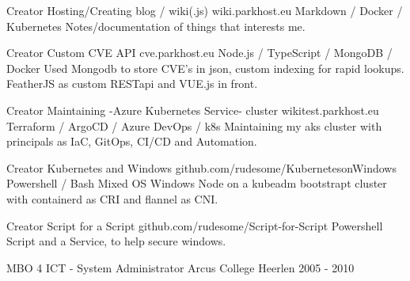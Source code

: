 \documentclass[11pt, letterpaper]{awesome-cv}
\begin{document}
\begin{cventries}

  \cventry
    {Creator}
    {Hosting/Creating blog / wiki(.js)}
    {wiki.parkhost.eu}
    {Markdown / Docker / Kubernetes}
    {Notes/documentation of things that interests me.}

  \cventry
    {Creator}
    {Custom CVE API}
    {cve.parkhost.eu}
    {Node.js / TypeScript / MongoDB / Docker}
    {Used Mongodb to store CVE's in json, custom indexing for rapid lookups. FeatherJS as custom RESTapi and VUE.js in front.}

  \cventry
    {Creator}
    {Maintaining -Azure Kubernetes Service- cluster}
    {wikitest.parkhost.eu}
    {Terraform / ArgoCD / Azure DevOps / k8s}
    {Maintaining my aks cluster with principals as IaC, GitOps, CI/CD and Automation.}

  \cventry
    {Creator}
    {Kubernetes and Windows}
    {github.com/rudesome/KubernetesonWindows}
    {Powershell / Bash}
    {Mixed OS Windows Node on a kubeadm bootstrapt cluster with containerd as CRI and flannel as CNI.}

  \cventry
    {Creator}
    {Script for a Script}
    {github.com/rudesome/Script-for-Script}
    {Powershell}
    {Script and a Service, to help secure windows.}


\end{cventries}

\begin{cventries}

  \cventry
    {MBO 4 ICT - System Administrator}
    {Arcus College}
    {Heerlen}
    {2005 - 2010}
    {
    }


\end{cventries}

\end{document}
